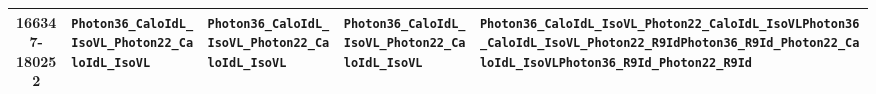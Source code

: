 \documentclass[dissertation.tex]{subfiles}
\begin{document}
\begin{table}[hcbp]
\begin{tabular}{|c|m{2.6cm}|m{2.6cm}|m{2.6cm}|m{2.6cm}|}
166347-180252 & \texttt{Photon36\_}\newline \texttt{CaloIdL\_}\newline \texttt{IsoVL\_}\newline \texttt{Photon22\_}\newline \texttt{CaloIdL\_}\newline \texttt{IsoVL} & \texttt{Photon36\_}\newline \texttt{CaloIdL\_}\newline \texttt{IsoVL\_}\newline \texttt{Photon22\_}\newline \texttt{CaloIdL\_}\newline \texttt{IsoVL} & \texttt{Photon36\_}\newline \texttt{CaloIdL\_}\newline \texttt{IsoVL\_}\newline \texttt{Photon22\_}\newline \texttt{CaloIdL\_}\newline \texttt{IsoVL} & \texttt{Photon36\_}\newline \texttt{CaloIdL\_}\newline \texttt{IsoVL\_}\newline \texttt{Photon22\_}\newline \texttt{CaloIdL\_}\newline \texttt{IsoVL}\newline\newline \texttt{Photon36\_}\newline \texttt{CaloIdL\_}\newline \texttt{IsoVL\_}\newline \texttt{Photon22\_}\newline \texttt{R9Id}\newline\newline \texttt{Photon36\_}\newline \texttt{R9Id\_}\newline \texttt{Photon22\_}\newline \texttt{CaloIdL\_}\newline \texttt{IsoVL}\newline\newline \texttt{Photon36\_}\newline \texttt{R9Id\_}\newline \texttt{Photon22\_}\newline \texttt{R9Id} \\
\hline
\end{tabular}
\label{tab:HLT_by_run_range}
\end{table}
\end{document}
